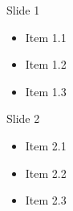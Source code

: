 \documentclass[14pt]{beamer}
\begin{document}
\begin{frame}{Slide 1}
    \begin{itemize}[<+->]
        \item Item 1.1
        \item Item 1.2
        \item Item 1.3
    \end{itemize}
\end{frame}

\begin{frame}{Slide 2}
    \begin{itemize}[<+->]
        \item Item 2.1
        \item Item 2.2
        \item Item 2.3
    \end{itemize}
\end{frame}
\end{document}
